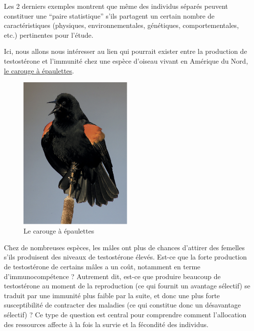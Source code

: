 \documentclass[
  a4paper,
  DIV=11,
  numbers=noendperiod,
  oneside]{scrreprt}
\begin{document}
Les 2 derniers exemples montrent que même des individus séparés peuvent
constituer une ``paire statistique'' s'ils partagent un certain nombre
de caractéristiques (physiques, environnementales, génétiques,
comportementales, etc.) pertinentes pour l'étude.

Ici, nous allons nous intéresser au lien qui pourrait exister entre la
production de testostérone et l'immunité chez une espèce d'oiseau vivant
en Amérique du Nord,
\href{https://fr.wikipedia.org/wiki/Carouge_à_épaulettes}{le carouge à
épaulettes}.

\begin{figure}

{\centering \includegraphics[width=0.5\textwidth,height=\textheight]{images/Blackbirds.png}

}

\caption{Le carouge à épaulettes}

\end{figure}

Chez de nombreuses espèces, les mâles ont plus de chances d'attirer des
femelles s'ils produisent des niveaux de testostérone élevés. Est-ce que
la forte production de testostérone de certains mâles a un coût,
notamment en terme d'immunocompétence ? Autrement dit, est-ce que
produire beaucoup de testostérone au moment de la reproduction (ce qui
fournit un avantage sélectif) se traduit par une immunité plus faible
par la suite, et donc une plus forte susceptibilité de contracter des
maladies (ce qui constitue donc un désavantage sélectif) ? Ce type de
question est central pour comprendre comment l'allocation des ressources
affecte à la fois la survie et la fécondité des individus.
\end{document}
